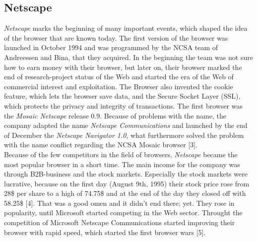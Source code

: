 \documentclass[runningheads]{llncs}
\begin{document}
		\subsection{Netscape}
		\textit{Netscape} marks the beginning of many important events, which shaped the idea of the browser that are known today. The first version of the browser was launched in October 1994 and was programmed by the NCSA team of Andreessen and Bina, that they acquired. In the beginning the team was not sure how to earn money with their browser, but later on, their browser marked the end of research-project status of the Web and started the era of the Web of commercial interest and exploitation. The Browser also invented the cookie feature, which lets the browser save data, and the Secure Socket Layer (SSL), which protects the privacy and integrity of transactions. The first browser was the \textit{Mosaic Netscape} release 0.9. Because of problems with the name, the company adapted the name \textit{Netscape Communications} and launched by the end of December the \textit{Netscape Navigator 1.0}, what furthermore solved the problem with the name conflict regarding the NCSA Mosaic browser [3].
		\\Because of the few competitors in the field of browsers, \textit{Netscape} became the most popular browser in a short time. The main income for the company was through B2B-business and the stock markets. Especially the stock markets were lucrative, because on the first day (August 9th, 1995) their stock price rose from 28\$ per share to a high of 74.75\$ and at the end of the day they closed off with 58.25\$ [4]. That was a good omen and it didn't end there; yet. They rose in popularity, until Microsoft started competing in the Web sector. Throught the competition of Microsoft Netscape Communications started improving their browser with rapid speed, which started the first browser wars [5].
\end{document}
